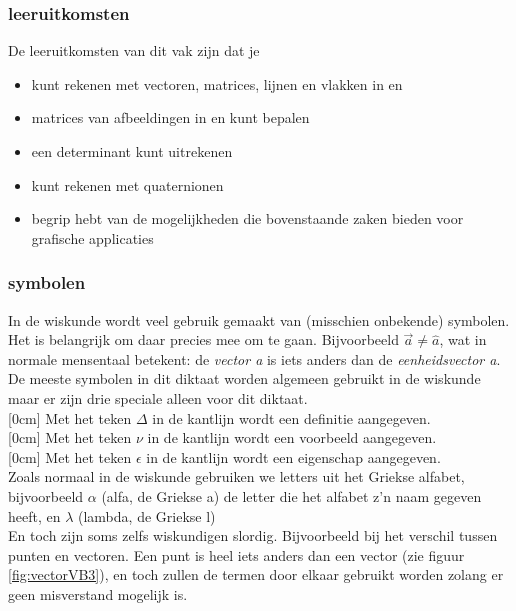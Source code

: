 \documentclass[hidelinks, a4wide, 12pt,  twoside]{book}
\begin{document}
\subsubsection*{leeruitkomsten}
De leeruitkomsten van dit vak zijn dat je
\begin{itemize}
        \setlength\itemsep{-1pt}
        \item kunt rekenen met vectoren, matrices, lijnen en vlakken  in \RT en \RD
        \item matrices van afbeeldingen in \RT en \RD kunt bepalen
        \item een determinant kunt uitrekenen
        \item kunt rekenen met quaternionen
        \item begrip hebt van de mogelijkheden die bovenstaande zaken bieden voor grafische applicaties
        \newline
    \end{itemize}

    


\subsubsection{symbolen}
In de wiskunde wordt veel gebruik gemaakt van (misschien onbekende) symbolen. Het is belangrijk om daar precies mee om te gaan. Bijvoorbeeld $ \vec{a} \ne \hat{a} $, wat in normale mensentaal betekent: de \textit{vector a} is iets anders dan de \textit{eenheidsvector a}. De meeste symbolen in dit diktaat worden algemeen gebruikt in de wiskunde maar er zijn drie speciale alleen voor dit diktaat.\\
[0cm]
Met het teken {\Large $ \Delta $ }in de kantlijn wordt een definitie aangegeven.\\
[0cm]
Met het teken {\LARGE $ \nu $ }  in de kantlijn wordt een voorbeeld aangegeven.\\
[0cm]
Met het teken {\LARGE $ \epsilon $ }  in de kantlijn wordt  een eigenschap aangegeven.\\
Zoals normaal in de wiskunde gebruiken we letters uit het Griekse alfabet, bijvoorbeeld $ \alpha $ (alfa, de Griekse a) de letter die het alfabet z'n naam gegeven heeft, en  $ \lambda $ (lambda, de Griekse l)\\
En toch zijn soms zelfs wiskundigen slordig. Bijvoorbeeld bij het verschil tussen punten en vectoren. Een punt is heel iets anders dan een vector  (zie figuur \ref{fig:vectorVB3}), en toch zullen de termen door elkaar gebruikt worden zolang er geen misverstand mogelijk is.
\end{document}
